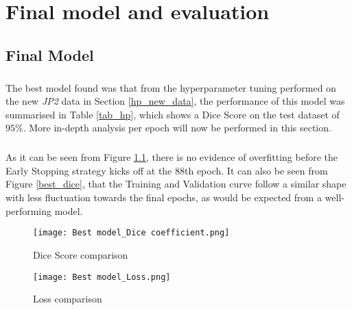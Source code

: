 \chapter{Final model and evaluation}
\section{Final Model}
\paragraph{}
The best model found was that from the hyperparameter tuning performed on the new \textit{JP2} data in Section \ref{hp_new_data}, the performance of this model was summarised in Table \ref{tab_hp}, which shows a Dice Score on the test dataset of $95\%$. More in-depth analysis per epoch will now be performed in this section.
\paragraph{}
As it can be seen from Figure \ref{best_loss}, there is no evidence of overfitting before the Early Stopping strategy kicks off at the 88th epoch. It can also be seen from Figure \ref{best_dice}, that the Training and Validation curve follow a similar shape with less fluctuation towards the final epochs, as would be expected from a well-performing model.

\begin{figure}[hbt!]
    \begin{minipage}[c]{0.5\linewidth}
    \texttt{[image: Best model\_Dice coefficient.png]}
    \caption{Dice Score comparison}
    \label{best_dice}
    \end{minipage}
        \hfill
        \begin{minipage}[c]{0.5\linewidth}
        \texttt{[image: Best model\_Loss.png]}
        \caption{Loss
        comparison}
        \label{best_loss}
    \end{minipage}
\end{figure}




